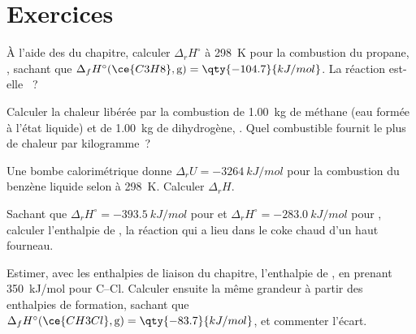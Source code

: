 \section{Exercices}

\begin{exercise}[$\star$]\label{exo:b2:reaction-enthalpy:1}
À l'aide des  du chapitre, calculer
$\Delta_r H^\circ$ à \qty{298}{K} pour la combustion du propane,
, sachant que $\Delta_f
H^\circ(\ce{C3H8}, \text{g}) = \qty{-104.7}{kJ/mol}$. La réaction est-elle
~?
\end{exercise}

\begin{exercise}[$\star$]\label{exo:b2:reaction-enthalpy:2}
Calculer la chaleur libérée par la combustion de \qty{1.00}{kg} de méthane (eau
formée à l'état liquide) et de \qty{1.00}{kg} de dihydrogène, . Quel combustible fournit le plus de chaleur par kilogramme~?
\end{exercise}

\begin{exercise}[$\star$]\label{exo:b2:reaction-enthalpy:3}
Une bombe calorimétrique donne $\Delta_r U = \qty{-3264}{kJ/mol}$ pour la combustion
du benzène liquide selon  à
\qty{298}{K}. Calculer $\Delta_r H$.
\end{exercise}

\begin{exercise}[$\star$]\label{exo:b2:reaction-enthalpy:4}
Sachant que $\Delta_r H^\circ = \qty{-393.5}{kJ/mol}$ pour  et $\Delta_r H^\circ = \qty{-283.0}{kJ/mol}$ pour , calculer l'enthalpie de ,
la réaction qui a lieu dans le coke chaud d'un haut fourneau.
\end{exercise}

\begin{exercise}[$\star\star$]\label{exo:b2:reaction-enthalpy:5}
Estimer, avec les enthalpies de liaison du chapitre, l'enthalpie de
, en prenant \qty{350}{kJ/mol} pour
C--Cl. Calculer ensuite la même grandeur à partir des enthalpies de formation,
sachant que $\Delta_f H^\circ(\ce{CH3Cl}, \text{g}) = \qty{-83.7}{kJ/mol}$, et
commenter l'écart.
\end{exercise}

